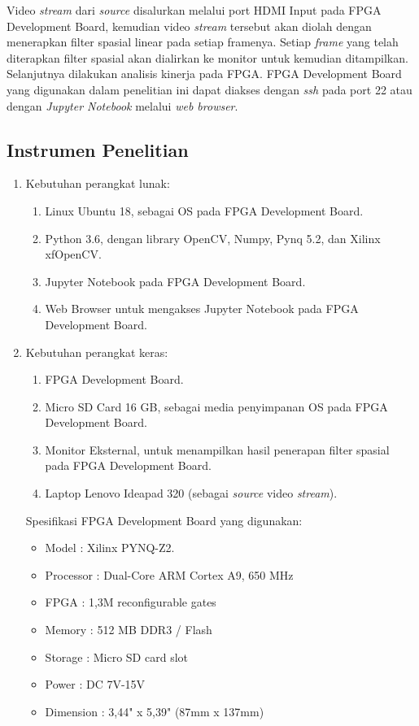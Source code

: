 Video \textit{stream} dari \textit{source} disalurkan melalui port HDMI Input pada FPGA Development Board, kemudian video \textit{stream} tersebut akan diolah dengan menerapkan filter spasial linear pada setiap framenya. Setiap \textit{frame} yang telah diterapkan filter spasial akan dialirkan ke monitor untuk kemudian ditampilkan. Selanjutnya dilakukan analisis kinerja pada FPGA. FPGA Development Board yang digunakan dalam penelitian ini dapat diakses dengan \textit{ssh} pada port 22 atau dengan \textit{Jupyter Notebook} melalui \textit{web browser}.

\subsection{Instrumen Penelitian}
\begin{enumerate}[topsep=0pt,itemsep=0pt,partopsep=0pt, parsep=0pt]
    \item Kebutuhan perangkat lunak:
    \begin{enumerate}[topsep=0pt,itemsep=0pt,partopsep=0pt, parsep=0pt, label={\alph*.}]
        \item Linux Ubuntu 18, sebagai OS pada FPGA Development Board.
        \item Python 3.6, dengan library OpenCV, Numpy, Pynq 5.2, dan Xilinx xfOpenCV.
        \item Jupyter Notebook pada FPGA Development Board. 
        \item Web Browser untuk mengakses Jupyter Notebook pada FPGA Development Board.
    \end{enumerate}
    \item Kebutuhan perangkat keras:
    \begin{enumerate}[topsep=0pt,itemsep=0pt,partopsep=0pt, parsep=0pt, label={\alph*.}]
        \item FPGA Development Board.
        \item Micro SD Card 16 GB, sebagai media penyimpanan OS pada FPGA Development Board.
        \item Monitor Eksternal, untuk menampilkan hasil penerapan filter spasial pada FPGA Development Board.
        \item Laptop Lenovo Ideapad 320 (sebagai \textit{source} video \textit{stream}).
    \end{enumerate}

    Spesifikasi FPGA Development Board yang digunakan:
    \begin{itemize}[topsep=0pt,itemsep=0pt,partopsep=0pt, parsep=0pt]
        \item Model : Xilinx PYNQ-Z2.
        \item Processor : Dual-Core ARM Cortex A9, 650 MHz
        \item FPGA : 1,3M reconfigurable gates
        \item Memory : 512 MB DDR3 / Flash
        \item Storage : Micro SD card slot
        \item Power : DC 7V-15V
        \item Dimension : 3,44" x 5,39" (87mm x 137mm)
    \end{itemize}
\end{enumerate}

